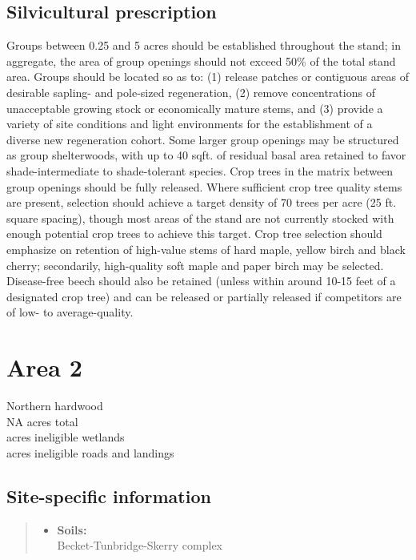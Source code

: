 \documentclass[]{tufte-handout}
\providecommand{\tightlist}{%
  \setlength{\itemsep}{0pt}\setlength{\parskip}{0pt}}
\begin{document}
\subsection{Silvicultural
prescription}\label{silvicultural-prescription}

Groups between 0.25 and 5 acres should be established throughout the
stand; in aggregate, the area of group openings should not exceed 50\%
of the total stand area. Groups should be located so as to: (1) release
patches or contiguous areas of desirable sapling- and pole-sized
regeneration, (2) remove concentrations of unacceptable growing stock or
economically mature stems, and (3) provide a variety of site conditions
and light environments for the establishment of a diverse new
regeneration cohort. Some larger group openings may be structured as
group shelterwoods, with up to 40 sqft. of residual basal area retained
to favor shade-intermediate to shade-tolerant species. Crop trees in the
matrix between group openings should be fully released. Where sufficient
crop tree quality stems are present, selection should achieve a target
density of 70 trees per acre (25 ft. square spacing), though most areas
of the stand are not currently stocked with enough potential crop trees
to achieve this target. Crop tree selection should emphasize on
retention of high-value stems of hard maple, yellow birch and black
cherry; secondarily, high-quality soft maple and paper birch may be
selected. Disease-free beech should also be retained (unless within
around 10-15 feet of a designated crop tree) and can be released or
partially released if competitors are of low- to average-quality.

\newpage

\section{Area 2}\label{area-2}

Northern hardwood\\
\noindent NA acres total\\
 acres ineligible wetlands\\
 acres ineligible roads and landings

\subsection{Site-specific
information}\label{site-specific-information-1}

\begin{quote}
\begin{itemize}
\tightlist
\item
  \textbf{Soils:}\\
  \indent\indent Becket-Tunbridge-Skerry complex
\end{itemize}
\end{quote}
\end{document}
